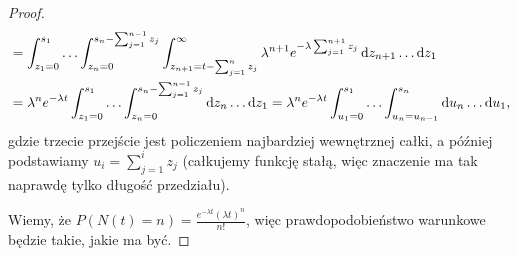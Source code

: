 \begin{proof}
\begin{align*}
		 & = \int_{z_1=0}^{s_1} \ldots \int_{z_n=0}^{s_n - \sum_{j=1}^{n-1} z_j} \int_{z_{n+1}= t - \sum_{j=1}^{n} z_j}^{\infty} \lambda^{n+1}e^{-\lambda \sum_{j=1}^{n+1} z_j} \mathop{}\!\mathrm{d}{z_{n+1}} \ldots\mathop{}\!\mathrm{d}{z_1}                                           \\
		 & = \lambda^{n} e^{-\lambda t } \int_{z_1=0}^{s_1} \ldots \int_{z_n=0}^{s_n - \sum_{j=1}^{n-1} z_j} \mathop{}\!\mathrm{d}{z_n} \ldots \mathop{}\!\mathrm{d}{z_1} = \lambda^{n}e^{-\lambda t } \int_{u_1=0}^{s_1} \ldots \int_{u_n = u_{n-1}}^{s_n} \mathop{}\!\mathrm{d}{u_n} \ldots\mathop{}\!\mathrm{d}{u_1} ,
	\end{align*}
	gdzie trzecie przejście jest policzeniem najbardziej wewnętrznej całki, a później podstawiamy \(u_i = \sum_{j=1}^{i} z_j\) (całkujemy funkcję stałą, więc znaczenie ma tak naprawdę tylko długość przedziału).

	Wiemy, że \(P\left( N\left( t  \right) = n  \right) = \frac{e^{-\lambda t }\left( \lambda t  \right) ^{n}}{n!}\), więc prawdopodobieństwo warunkowe będzie takie, jakie ma być.
\end{proof}

